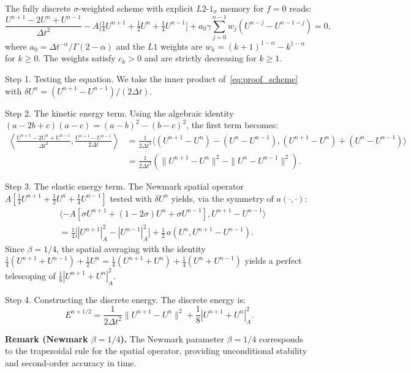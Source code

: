 \documentclass[a4paper,fleqn]{cas-sc}
\begin{document}
\begin{appendix}
The fully discrete $\sigma$-weighted scheme with explicit $L2$-$1_\sigma$ memory for $f=0$ reads:
\begin{equation}\label{eq:proof_scheme}
\frac{U^{n+1} - 2U^n + U^{n-1}}{\Delta t^2} - A\bigl[\tfrac{1}{4}U^{n+1} + \tfrac{1}{2}U^n + \tfrac{1}{4}U^{n-1}\bigr] + a_0 \gamma \sum_{j=0}^{n-1} w_j (U^{n-j}-U^{n-1-j}) = 0,
\end{equation}
where $a_0 = \Delta t^{-\alpha} / \Gamma(2-\alpha)$ and the $L1$ weights are $w_k = (k+1)^{1-\alpha} - k^{1-\alpha}$ for $k \ge 0$. 
The weights satisfy $c_k > 0$ and are strictly decreasing for $k \ge 1$.

Step 1. Testing the equation. 
We take the inner product of~\eqref{eq:proof_scheme} with $\delta U^n = (U^{n+1} - U^{n-1})/(2\Delta t)$.

Step 2. The kinetic energy term. 
Using the algebraic identity $(a - 2b + c)(a - c) = (a-b)^2 - (b-c)^2$, the first term becomes:
\begin{align*}
\left\langle \frac{U^{n+1} - 2U^n + U^{n-1}}{\Delta t^2}, \frac{U^{n+1} - U^{n-1}}{2 \Delta t} \right\rangle &= \frac{1}{2\Delta t^3} \langle (U^{n+1} - U^n) - (U^n - U^{n-1}), (U^{n+1} - U^n) + (U^n - U^{n-1}) \rangle \\
&= \frac{1}{2\Delta t^3} \left( \|U^{n+1} - U^n\|^2 - \|U^n - U^{n-1}\|^2 \right).
\end{align*}

Step 3. The elastic energy term. 
The Newmark spatial operator $A[\frac{1}{4}U^{n+1} + \frac{1}{2}U^n + \frac{1}{4}U^{n-1}]$ tested with $\delta U^n$ yields, via the symmetry of $a(\cdot,\cdot)$:
\begin{align*}
&\langle -A[\sigma U^{n+1} + (1-2\sigma)U^n + \sigma U^{n-1}], U^{n+1}-U^{n-1}\rangle \\
&= \frac{1}{4}\bigl[|U^{n+1}|_A^2 - |U^{n-1}|_A^2\bigr] + \frac{1}{2}\,a(U^n, U^{n+1}-U^{n-1}).
\end{align*}
Since $\beta = 1/4$, the spatial averaging with the identity $\frac{1}{4}(U^{n+1}+U^{n-1})+\frac{1}{2}U^n = \frac{1}{4}(U^{n+1}+U^n)+\frac{1}{4}(U^n+U^{n-1})$ yields a perfect telescoping of $\frac{1}{8}|U^{n+1}+U^n|_A^2$.

Step 4. Constructing the discrete energy. 
The discrete energy is:
\begin{equation}\label{eq:proof_energy}
E^{n+1/2} = \frac{1}{2\Delta t^2} \|U^{n+1} - U^n\|^2 + \frac{1}{8} |U^{n+1}+U^n|_A^2.
\end{equation}

\textbf{Remark (Newmark $\beta=1/4$).} The Newmark parameter $\beta = 1/4$ corresponds to the trapezoidal rule for the spatial operator, providing unconditional stability and second-order accuracy in time.


\end{appendix}
\end{document}
